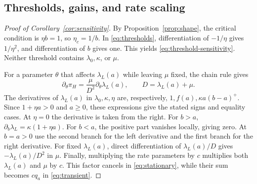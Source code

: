 \documentclass[11pt]{article}
\theoremstyle{definition}
\newcommand{\lam}{\lambda_L}
\newcommand{\share}{\pi_H}
\begin{document}
\subsection{Thresholds, gains, and rate scaling}\label{app:sensitivity}
\begin{proof}[Proof of Corollary~\ref{cor:sensitivity}]
By Proposition~\ref{prop:shape}, the critical condition is $\eta b=1$,
so $\eta_c=1/b$. In \eqref{eq:thresholds}, differentiation of
$-1/\eta$ gives $1/\eta^2$, and differentiation of $b$ gives one.
This yields \eqref{eq:threshold-sensitivity}. Neither threshold
contains $\lambda_0,\kappa$, or $\mu$.

For a parameter $\theta$ that affects $\lam(a)$ while leaving $\mu$
fixed, the chain rule gives
\[
 \partial_\theta\share
 =\frac{\mu}{D^2}\partial_\theta\lam(a),\qquad
 D=\lam(a)+\mu .
\]
The derivatives of $\lam(a)$ in $\lambda_0,\kappa,\eta$ are, respectively,
$1,f(a),\kappa a(b-a)^+$. Since $1+\eta a>0$ and $a\geq0$, these
expressions give the stated signs and equality cases. At $\eta=0$
the derivative is taken from the right. For $b>a$,
$\partial_b\lam=\kappa(1+\eta a)$. For $b<a$, the positive part vanishes
locally, giving zero. At $b=a>0$ use the second branch for the left
derivative and the first branch for the right derivative. For fixed
$\lam(a)$, direct differentiation of $\lam(a)/D$ gives
$-\lam(a)/D^2$ in $\mu$. Finally, multiplying the rate parameters
by $c$ multiplies both $\lam(a)$ and $\mu$ by $c$. This factor cancels
in \eqref{eq:stationary}, while their sum becomes $cq_a$ in
\eqref{eq:transient}.


\end{proof}
\end{document}

